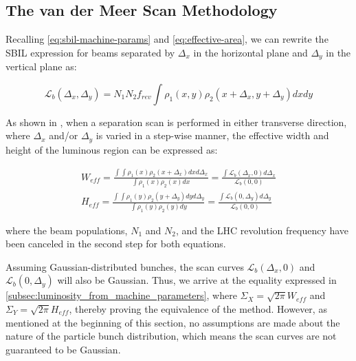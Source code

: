 \subsection{The van der Meer Scan Methodology}
\label{subsec:the_van_der_meer_scan_methodology}

Recalling \autoref{eq:sbil-machine-params} and \autoref{eq:effective-area}, we can rewrite the SBIL expression for beams separated by $\Delta_x$ in the horizontal plane and $\Delta_y$ in the vertical plane as:

\begin{equation}
    \label{eq:sbil_separating_planes}
    \mathcal{L}_b \left( \Delta_x, \Delta_y \right) = N_1 N_2 f_{rev} \int \rho_1 (x, y) \rho_2 (x + \Delta_x, y + \Delta_y) dx dy
\end{equation}

As shown in \cite{vanderMeer:296752}, when a separation scan is performed in either transverse direction, where $\Delta_x$ and/or $\Delta_y$ is varied in a step-wise manner, the effective width and height of the luminous region can be expressed as:

\begin{equation}
    \begin{aligned}
        \label{eq:effective_width_height_scan}
        W_{eff} = \frac{\int \int \rho_1 (x) \rho_2 (x + \Delta_x) dx d\Delta_x}{\int \rho_1 (x) \rho_2 (x) dx} = \frac{\int \mathcal{L}_b \left( \Delta_x, 0 \right) d\Delta_x}{\mathcal{L}_b \left( 0, 0 \right)} \\
        H_{eff} = \frac{\int \int \rho_1 (y) \rho_2 (y + \Delta_y) dy d\Delta_y}{\int \rho_1 (y) \rho_2 (y) dy} = \frac{\int \mathcal{L}_b \left( 0, \Delta_y \right) d\Delta_y}{\mathcal{L}_b \left( 0, 0 \right)}
    \end{aligned}
\end{equation}

where the beam populations, $N_1$ and $N_2$, and the LHC revolution frequency have been canceled in the second step for both equations.

Assuming Gaussian-distributed bunches, the scan curves $\mathcal{L}_b \left( \Delta_x, 0 \right)$ and $\mathcal{L}_b \left( 0, \Delta_y \right)$ will also be Gaussian. Thus, we arrive at the equality expressed in \autoref{subsec:luminosity_from_machine_parameters}, where $\Sigma_X = \sqrt{2\pi} W_{eff}$ and $\Sigma_Y = \sqrt{2\pi} H_{eff}$, thereby proving the equivalence of the method. However, as mentioned at the beginning of this section, no assumptions are made about the nature of the particle bunch distribution, which means the scan curves are not guaranteed to be Gaussian.

